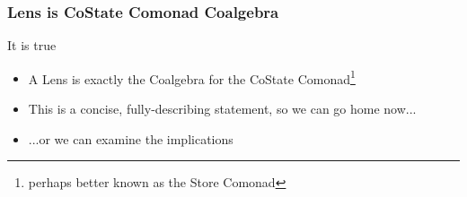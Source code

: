 \begin{frame}
\frametitle{Lens is CoState Comonad Coalgebra}

\begin{block}{It is true}
  \begin{itemize}
  \item A Lens is exactly the Coalgebra for the CoState Comonad\footnote{perhaps better known as the Store Comonad}
  \item This is a concise, fully-describing statement, so we can go home now...
  \item ...or we can examine the implications
  \end{itemize}
\end{block}
\end{frame}

